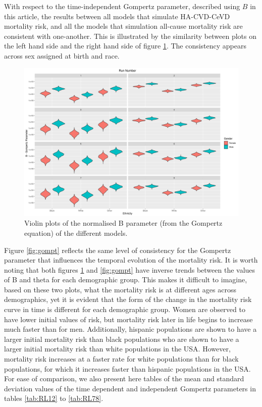 \documentclass[
]{article}
\begin{document}
With respect to the time-independent Gompertz parameter, described using \(B\) in this article, the results between all models that simulate HA-CVD-CeVD mortality risk, and all the models that simulation all-cause mortality risk are consistent with one-another. This is illustrated by the similarity between plots on the left hand side and the right hand side of figure \ref{fig:gompB}. The consistency appears across sex assigned at birth and race.

\begin{figure}
\hypertarget{fig:gompB}{%
\centering
\includegraphics{./Plots/gompertz/B_parameter.png}
\caption{Violin plots of the normalised B parameter (from the Gompertz equation) of the different models.}\label{fig:gompB}
}
\end{figure}

Figure \ref{fig:gompt} reflects the same level of consistency for the Gompertz parameter that influences the temporal evolution of the mortality risk. It is worth noting that both figures \ref{fig:gompB} and \ref{fig:gompt} have inverse trends between the values of B and theta for each demographic group. This makes it difficult to imagine, based on these two plots, what the mortality risk is at different ages across demographics, yet it is evident that the form of the change in the mortality risk curve in time is different for each demographic group. Women are observed to have lower initial values of risk, but mortality risk later in life begins to increase much faster than for men. Additionally, hispanic populations are shown to have a larger initial mortality risk than black populations who are shown to have a larger initial mortality risk than white populations in the USA. However, mortality risk increases at a faster rate for white populations than for black populations, for which it increases faster than hispanic populations in the USA. For ease of comparison, we also present here tables of the mean and standard deviation values of the time dependent and independent Gompertz parameters in tables \ref{tab:RL12} to \ref{tab:RL78}.
\end{document}
